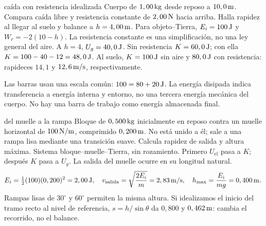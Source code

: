 \documentclass[11pt,a4paper]{article}
\begin{document}
\begin{examplebox}{ca\'ida con resistencia idealizada}
 Cuerpo de $1,00\,\mathrm{kg}$ desde reposo a $10,0\,\mathrm{m}$.
Compara ca\'ida libre y resistencia constante de $2,00\,\mathrm{N}$ hacia arriba.
Halla rapidez al llegar al suelo y balance a $h=4,00\,\mathrm{m}$.
\solutionblock
{} Para objeto--Tierra, $E_i=100\,\mathrm{J}$ y
$W_r=-2(10-h)$. La resistencia constante es una simplificaci\'on,
no una ley general del aire.
 A $h=4$, $U_g=40,0\,\mathrm{J}$.
Sin resistencia $K=60,0\,\mathrm{J}$; con ella $K=100-40-12=48,0\,\mathrm{J}$.
Al suelo, $K=100\,\mathrm{J}$ sin aire y $80,0\,\mathrm{J}$ con resistencia:
rapideces $14,1$ y $12,6\,\mathrm{m/s}$, respectivamente.
\begin{center}
\end{center}
 Las barras usan una escala com\'un:
$100=80+20\,\mathrm{J}$. La energ\'ia disipada indica transferencia a energ\'ia interna
y entorno, no una tercera energ\'ia mec\'anica del cuerpo.
No hay una barra de trabajo como energ\'ia almacenada final.
\end{examplebox}

\begin{examplebox}{del muelle a la rampa}
 Bloque de $0,500\,\mathrm{kg}$ inicialmente en reposo contra un muelle
horizontal de $100\,\mathrm{N/m}$, comprimido $0,200\,\mathrm{m}$.
No est\'a unido a \'el; sale a una rampa lisa mediante una transici\'on suave.
Calcula rapidez de salida y altura m\'axima.
\solutionblock
{} Sistema bloque--muelle--Tierra, sin rozamiento.
Primero $U_{\mathrm{el}}$ pasa a $K$; despu\'es $K$ pasa a $U_g$.
La salida del muelle ocurre en su longitud natural.
\[
E_i=\tfrac12(100)(0,200)^2=2,00\,\mathrm{J},\quad
v_{\mathrm{salida}}=\sqrt{\frac{2E_i}{m}}=2,83\,\mathrm{m/s},\quad
h_{\max}=\frac{E_i}{mg}=0,400\,\mathrm{m}.
\]
 Rampas lisas de $30^\circ$ y $60^\circ$ permiten la misma
altura. Si idealizamos el inicio del tramo recto al nivel de referencia,
$s=h/\sin\theta$ da $0,800$ y $0,462\,\mathrm{m}$: cambia el recorrido, no el balance.
\end{examplebox}
\end{document}
